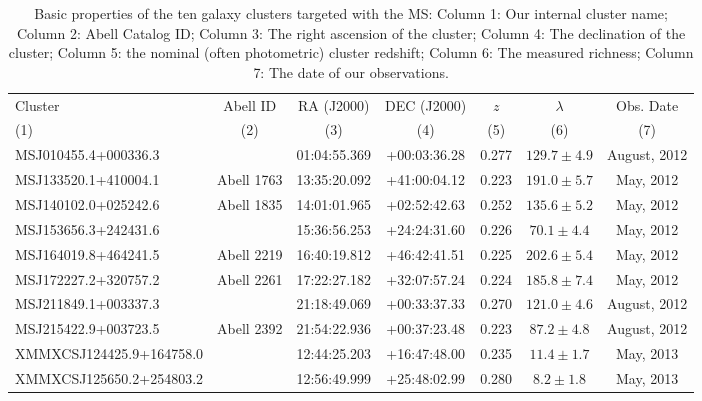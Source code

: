 \begin{landscape}
	\begin{table}
	\caption[Basic properties of the ten galaxy clusters targeted with the MS.]{Basic properties of the ten galaxy clusters targeted with the MS: Column 1: Our internal cluster name; Column 2: Abell Catalog ID; Column 3: The right ascension of the cluster; Column 4: The declination of the cluster; Column 5: the nominal (often photometric) cluster redshift; Column 6: The measured richness; Column 7: The date of our observations.}
	\begin{centering} 
	\begin{tabular}{lcccccc} 
		\hline 
		Cluster & Abell ID & RA (J2000) & DEC (J2000) & $z$ & $\lambda$ & Obs. Date\\
		(1) & (2) & (3) & (4) & (5) & (6) & (7) \\
		\hline \hline
		MSJ010455.4+000336.3 & \nd & 01:04:55.369 & +00:03:36.28 & 0.277 & $129.7\pm4.9$ & August, 2012 \\
		MSJ133520.1+410004.1 & Abell 1763 & 13:35:20.092 & +41:00:04.12 & 0.223 & $191.0\pm5.7$ & May, 2012 \\
		MSJ140102.0+025242.6 & Abell 1835 & 14:01:01.965 & +02:52:42.63 & 0.252 & $135.6\pm5.2$ & May, 2012 \\
		MSJ153656.3+242431.6 & \nd & 15:36:56.253 & +24:24:31.60 & 0.226 & $70.1\pm4.4$ & May, 2012 \\ 
		MSJ164019.8+464241.5 & Abell 2219 & 16:40:19.812 & +46:42:41.51 & 0.225 & $202.6\pm5.4$ & May, 2012 \\
		MSJ172227.2+320757.2 & Abell 2261 & 17:22:27.182 & +32:07:57.24 & 0.224 & $185.8\pm7.4$ & May, 2012 \\
		MSJ211849.1+003337.3 & \nd & 21:18:49.069 & +00:33:37.33 & 0.270 & $121.0\pm4.6$ & August, 2012 \\
		MSJ215422.9+003723.5 & Abell 2392 & 21:54:22.936 & +00:37:23.48 & 0.223 & $87.2\pm4.8$ & August, 2012\\
		XMMXCSJ124425.9+164758.0 & \nd & 12:44:25.203 & +16:47:48.00 & 0.235 & $11.4\pm1.7$ & May, 2013 \\
		XMMXCSJ125650.2+254803.2 & \nd & 12:56:49.999 & +25:48:02.99 & 0.280 & $8.2\pm1.8$ & May, 2013 \\
		\hline 
		\end{tabular}
	\end{centering}
		\label{2tbl:targets} 
	\end{table}
\end{landscape}

